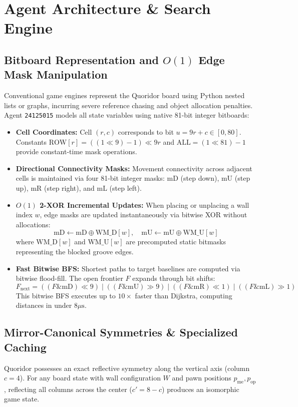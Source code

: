 \section{Agent Architecture \& Search Engine}

\subsection{Bitboard Representation and $O(1)$ Edge Mask Manipulation}
Conventional game engines represent the Quoridor board using Python nested lists or graphs, incurring severe reference chasing and object allocation penalties. Agent \texttt{24125015} models all state variables using native 81-bit integer bitboards:
\begin{itemize}[leftmargin=1.5em]
    \item \textbf{Cell Coordinates:} Cell $(r, c)$ corresponds to bit $u = 9r + c \in [0, 80]$. Constants $\text{ROW}[r] = ((1 \ll 9) - 1) \ll 9r$ and $\text{ALL} = (1 \ll 81) - 1$ provide constant-time mask operations.
    \item \textbf{Directional Connectivity Masks:} Movement connectivity across adjacent cells is maintained via four 81-bit integer masks: $\text{mD}$ (step down), $\text{mU}$ (step up), $\text{mR}$ (step right), and $\text{mL}$ (step left).
    \item \textbf{$O(1)$ 2-XOR Incremental Updates:} When placing or unplacing a wall index $w$, edge masks are updated instantaneously via bitwise XOR without allocations:
    \begin{equation}
        \text{mD} \leftarrow \text{mD} \oplus \text{WM\_D}[w], \quad \text{mU} \leftarrow \text{mU} \oplus \text{WM\_U}[w]
    \end{equation}
    where $\text{WM\_D}[w]$ and $\text{WM\_U}[w]$ are precomputed static bitmasks representing the blocked groove edges.
    \item \textbf{Fast Bitwise BFS:} Shortest paths to target baselines are computed via bitwise flood-fill. The open frontier $F$ expands through bit shifts:
    \begin{equation}
        F_{\text{next}} = ((F \& \text{mD}) \ll 9) \mid ((F \& \text{mU}) \gg 9) \mid ((F \& \text{mR}) \ll 1) \mid ((F \& \text{mL}) \gg 1)
    \end{equation}
    This bitwise BFS executes up to $10\times$ faster than Dijkstra, computing distances in under $8\mu\text{s}$.
\end{itemize}

\subsection{Mirror-Canonical Symmetries \& Specialized Caching}
Quoridor possesses an exact reflective symmetry along the vertical axis (column $c = 4$). For any board state with wall configuration $W$ and pawn positions $p_{\text{me}}, p_{\text{op}}$, reflecting all columns across the center ($c' = 8 - c$) produces an isomorphic game state.

